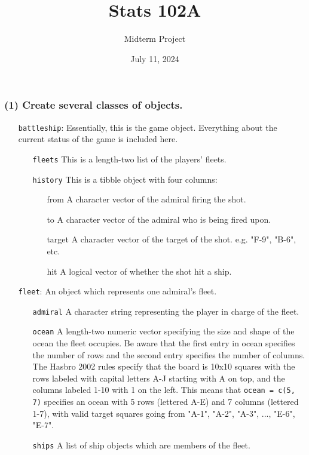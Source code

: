\documentclass[
]{article}
\title{Stats 102A}
\subtitle{Midterm Project}
\author{}
\date{\vspace{-2.5em}July 11, 2024}
\begin{document}
\maketitle

\subsubsection{(1) Create several classes of
objects.}\label{create-several-classes-of-objects.}

\begin{itemize}
\item[\texttt{battleship}:] Essentially, this is the game object. Everything about the current status of the game is included here.
  \begin{itemize}
    \item[\texttt{fleets}] This is a length-two list of the players' fleets.
    \item[\texttt{history}] This is a tibble object with four columns:
    \begin{itemize}
      \item[from] A character vector of the admiral firing the shot.
      \item[to] A character vector of the admiral who is being fired upon.
      \item[target] A character vector of the target of the shot. e.g. "F-9", "B-6", etc.
      \item[hit] A logical vector of whether the shot hit a ship.
    \end{itemize}
  \end{itemize}

\item[\texttt{fleet}:] An object which represents one admiral's fleet.
\begin{itemize}
  \item[\texttt{admiral}] A character string representing the player in charge of the fleet.
  \item[\texttt{ocean}] A length-two numeric vector specifying the size and shape of the ocean the fleet occupies. Be aware that the first entry in ocean specifies the number of rows and the second entry specifies the number of columns. The Hasbro 2002 rules specify that the board is 10x10 squares with the rows labeled with capital letters A-J starting with A on top, and the columns labeled 1-10 with 1 on the left. This means that \texttt{ocean = c(5, 7)} specifies an ocean with 5 rows (lettered A-E) and 7 columns (lettered 1-7), with valid target squares going from "A-1", "A-2", "A-3", ..., "E-6", "E-7".
  \item[\texttt{ships}] A list of ship objects which are members of the fleet.
\end{itemize}


\end{itemize}
\end{document}
